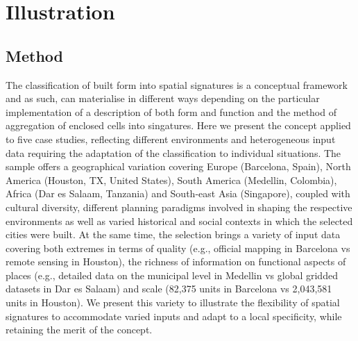 \section{Illustration}
\label{sec:app}



\subsection{Method}

The classification of built form into spatial signatures is a conceptual framework and
as such, can materialise in different ways depending on the particular implementation of
a description of both form and function and the method of aggregation of enclosed cells
into singatures.
Here we present the concept applied to five case studies, reflecting different
environments and heterogeneous input data requiring the adaptation of the classification
to individual situations.
The sample offers a geographical variation covering Europe (Barcelona, Spain), North
America (Houston, TX, United States), South America (Medellin, Colombia), Africa (Dar es
Salaam, Tanzania) and South-east Asia (Singapore),
coupled with cultural diversity, different planning paradigms involved in shaping the
respective environments as well as varied historical and social contexts in which the
selected cities were built.
At the same time, the selection brings a variety of input data covering both extremes in
terms of quality (e.g., official mapping in Barcelona vs remote sensing in Houston), the
richness of information on functional aspects of places (e.g., detailed data on the
municipal level in Medellin vs global gridded datasets in Dar es Salaam) and scale
(82,375 units in Barcelona vs 2,043,581 units in Houston).
We present this variety to illustrate the flexibility of spatial signatures to
accommodate varied inputs and adapt to a local specificity, while retaining the merit of
the concept.

